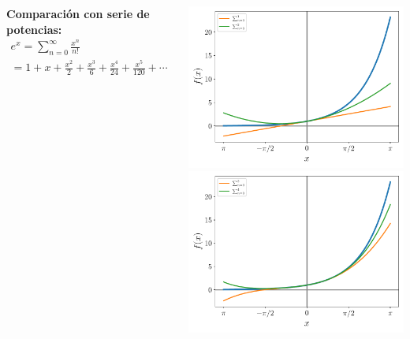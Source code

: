 \documentclass[9pt, aspectratio=169]{beamer}
\begin{document}
\begin{frame}
\begin{columns}[t]
\cx
\textbf{Comparación con serie de potencias:}
\begin{multline*}
e^x = \sum_{n = 0}^{\infty} \frac{x^n}{n!} \\
= 1 + x + \frac{x^2}{2} + \frac{x^3}{6} + \frac{x^4}{24} + \frac{x^5}{120} + \cdots
\end{multline*}
\begin{center}
     {\includegraphics[scale=0.45]{figs/pot-12.pdf}}
     {\includegraphics[scale=0.45]{figs/pot-34.pdf}}
\end{center}
\end{columns}

\end{frame}
\end{document}
